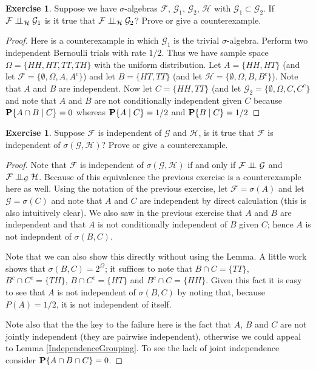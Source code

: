 \documentclass{amsart}
\theoremstyle{remark}
\theoremstyle{definition}
\newtheorem{ex}[thm]{Exercise}
\begin{document}
\begin{ex}Suppose we have $\sigma$-algebras $\mathcal{F}$,
  $\mathcal{G}_1$, $\mathcal{G}_2$, $\mathcal{H}$ with $\mathcal{G}_1
  \subset \mathcal{G}_2$.  If
  $\cindependent{\mathcal{F}}{\mathcal{G}_1}{\mathcal{H}}$
is it true that $\cindependent{\mathcal{F}}{\mathcal{G}_2}{\mathcal{H}}$?
Prove or give a counterexample.
\end{ex}
\begin{proof}
Here is a counterexample in which $\mathcal{G}_1$ is the trivial
$\sigma$-algebra.  Perform two independent Bernoulli trials with rate
$1/2$.  Thus we have sample space $\Omega = \lbrace HH, HT, TT, TH
\rbrace$ with the uniform distribution.  Let $A = \lbrace HH, HT
\rbrace$ (and let $\mathcal{F} = \lbrace \emptyset, \Omega, A, A^c
\rbrace$) and let $B = \lbrace HT, TT \rbrace$ (and let $\mathcal{H} =
\lbrace \emptyset , \Omega, B, B^c \rbrace$).  Note that $A$ and $B$
are independent.  Now let $C = \lbrace HH, TT \rbrace$ (and let
$\mathcal{G}_2 = \lbrace \emptyset, \Omega, C, C^c \rbrace$ and note
that $A$ and $B$ are not conditionally independent given $C$ because
$\cprobability{C}{A \cap B} = 0$ whereas $\cprobability{C}{A} = 1/2$
and $\cprobability{C}{B} = 1/2$
\end{proof}

\begin{ex}Suppose $\mathcal{F}$ is independent of $\mathcal{G}$ and
  $\mathcal{H}$, is it true that $\mathcal{F}$ is independent of
  $\sigma(\mathcal{G}, \mathcal{H})$?  Prove or give a counterexample.
\end{ex}
\begin{proof}
Note that $\mathcal{F}$ is independent of
  $\sigma(\mathcal{G}, \mathcal{H})$ if and only if
  $\cindependent{\mathcal{F}}{\mathcal{G}}{}$
and $\cindependent{\mathcal{F}}{\mathcal{H}}{\mathcal{G}}$.  Because
of this equivalence the previous exercise is a counterexample here as
well.  Using the
notation of the previous exercise, let $\mathcal{F} = \sigma(A)$ and
let $\mathcal{G} = \sigma(C)$ and note that $A$ and $C$ are
independent
by direct calculation (this is also intuitively clear).  We also saw
in the previous exercise that $A$ and $B$ are independent and that $A$
is not conditionally independent of $B$ given $C$; hence $A$ is not
indepndent of $\sigma(B,C)$.

Note that we can also show this directly without using the Lemma. A
little work shows that $\sigma(B,C) = 2^\Omega$; it suffices to
note that $B \cap C = \lbrace TT \rbrace$,  $B^c \cap C^c = \lbrace TH
\rbrace$, $B \cap C^c = \lbrace HT \rbrace$ and $B^c \cap C = \lbrace HH
\rbrace$.  Given this fact
it is easy to see that $A$ is not independent of $\sigma(B,C)$ by noting that, because
$P(A) = 1/2$, it is not independent of itself.

Note also that the the key to the failure here is the fact that $A$, $B$
and $C$ are not jointly independent (they are pairwise independent),
otherwise we could appeal to Lemma \ref{IndependenceGrouping}.
To see the lack of joint independence consider $\probability {A \cap B
\cap C} = 0$.
\end{proof}
\end{document}
